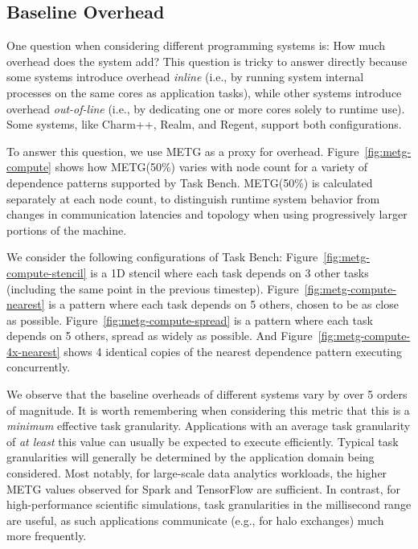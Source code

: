 \subsection{Baseline Overhead}

One question when considering different programming
systems is: How much overhead does the system add? This question is tricky to answer directly because some systems introduce
overhead \emph{inline} (i.e., by running system internal processes on
the same cores as application tasks), while other systems introduce
overhead \emph{out-of-line} (i.e., by dedicating one or more cores
solely to runtime use). Some systems, like Charm++, Realm, and Regent,
support both configurations.

To answer this question, we use METG %
as a proxy for overhead. Figure~\ref{fig:metg-compute}
shows how METG(50\%) varies with node count for a variety of
dependence patterns supported by Task Bench. METG(50\%) is calculated
separately at each node count, to distinguish runtime system behavior from
changes in communication latencies and topology when using
progressively larger portions of the machine.

We consider the following configurations of Task Bench:
Figure~\ref{fig:metg-compute-stencil} is a 1D stencil where each task
depends on 3 other tasks (including the same point in the previous
timestep). Figure~\ref{fig:metg-compute-nearest} is a pattern where
each task depends on 5 others, chosen to be as close as
possible. Figure~\ref{fig:metg-compute-spread} is a pattern where each
task depends on 5 others, spread as widely as possible. And
Figure~\ref{fig:metg-compute-4x-nearest} shows 4 identical copies of
the nearest dependence pattern executing concurrently.

We observe that the baseline overheads of different
systems vary by over 5 orders of magnitude. It is worth
remembering when considering this metric that this is a \emph{minimum}
effective task granularity. Applications with an average
task granularity of \emph{at least} this value can usually be expected
to execute efficiently. Typical task granularities will
generally be determined by the application domain being
considered. Most notably, for large-scale data analytics workloads, the higher METG values observed for Spark and
TensorFlow are sufficient. In contrast, for high-performance
scientific simulations, task granularities in the millisecond range
are useful, as such applications communicate (e.g., for halo
exchanges) much more frequently.

